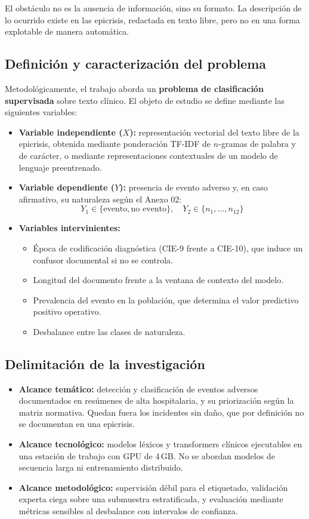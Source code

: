 \documentclass[conference]{IEEEtran}
\begin{document}
El obstáculo no es la ausencia de información, sino su formato. La descripción
de lo ocurrido existe en las epicrisis, redactada en texto libre, pero no en
una forma explotable de manera automática.

\subsection{Definición y caracterización del problema}
Metodológicamente, el trabajo aborda un \textbf{problema de clasificación
supervisada} sobre texto clínico. El objeto de estudio se define mediante las
siguientes variables:

\begin{itemize}
\item \textbf{Variable independiente ($X$):} representación vectorial del
texto libre de la epicrisis, obtenida mediante ponderación TF-IDF de $n$-gramas
de palabra y de carácter, o mediante representaciones contextuales de un modelo
de lenguaje preentrenado.
\item \textbf{Variable dependiente ($Y$):} presencia de evento adverso y, en
caso afirmativo, su naturaleza según el Anexo 02:
\begin{equation}
Y_1 \in \{\text{evento}, \text{no evento}\}, \quad
Y_2 \in \{n_1, \dots, n_{12}\}
\end{equation}
\item \textbf{Variables intervinientes:}
\begin{itemize}
\item Época de codificación diagnóstica (CIE-9 frente a CIE-10), que induce un
confusor documental si no se controla.
\item Longitud del documento frente a la ventana de contexto del modelo.
\item Prevalencia del evento en la población, que determina el valor predictivo
positivo operativo.
\item Desbalance entre las clases de naturaleza.
\end{itemize}
\end{itemize}

\subsection{Delimitación de la investigación}
\begin{itemize}
\item \textbf{Alcance temático:} detección y clasificación de eventos adversos
documentados en resúmenes de alta hospitalaria, y su priorización según la
matriz normativa. Quedan fuera los incidentes sin daño, que por definición no
se documentan en una epicrisis.
\item \textbf{Alcance tecnológico:} modelos léxicos y transformers clínicos
ejecutables en una estación de trabajo con GPU de 4\,GB. No se abordan modelos
de secuencia larga ni entrenamiento distribuido.
\item \textbf{Alcance metodológico:} supervisión débil para el etiquetado,
validación experta ciega sobre una submuestra estratificada, y evaluación
mediante métricas sensibles al desbalance con intervalos de confianza.
\end{itemize}
\end{document}
